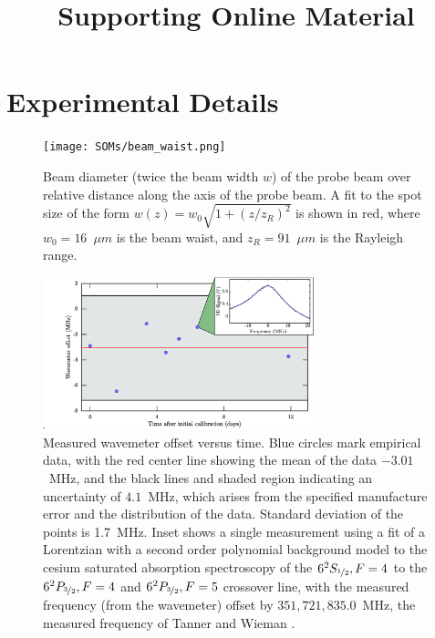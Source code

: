 \documentclass[%
 amsmath,amssymb,
aps,
]{revtex4-2}
\begin{document}
\title{Supporting Online Material}
\maketitle

\section{Experimental Details}
\label{sec:exp-details}
\begin{figure}
    \centering
    \texttt{[image: SOMs/beam\_waist.png]}
    \caption{Beam diameter (twice the beam width \(w\)) of the probe beam over relative distance along the axis of the probe beam. A fit to the spot size of the form \(w(z) = w_0 \sqrt{1+(z/z_R)^2}\) is shown in red, where \(w_0=16\)~\(\mu m\) is the beam waist, and \(z_R=91\)~\(\mu m\) is the Rayleigh range.}
    \label{fig:BEAM_WAIST}
\end{figure}

\begin{figure}
    \centering
    \includegraphics[width=0.7\textwidth]{SOMs/wm_err}
    \caption{Measured wavemeter offset versus time. Blue circles mark empirical data, with the red center line showing the mean of the data \(-3.01\)~MHz, and the black lines and shaded region indicating an uncertainty of \(4.1\)~MHz, which arises from the specified manufacture error and the distribution of the data. Standard deviation of the points is 1.7~MHz. Inset shows a single measurement using a fit of a Lorentzian with a second order polynomial background model to the cesium saturated absorption spectroscopy  of the \(6^2S_{\nicefrac{1}{2}}, F=4\) to the \(6^2P_{\nicefrac{3}{2}}, F=4\) and \(6^2P_{\nicefrac{3}{2}}, F=5\)  crossover line, with the measured frequency (from the wavemeter) offset by \(351,721,835.0\)~MHz, the measured frequency of Tanner and Wieman \cite{pmid9900545}.}
    \label{fig:wm_model}
\end{figure}
\end{document}
